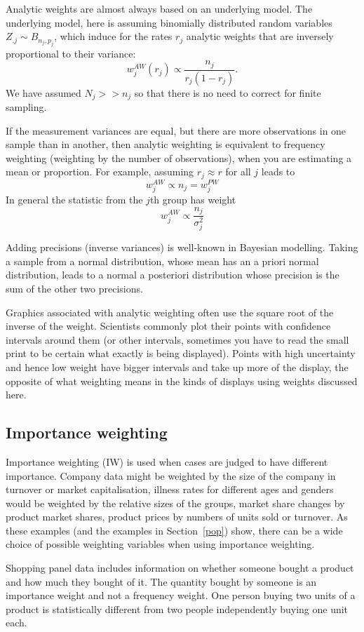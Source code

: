 \documentclass{svmult}
\begin{document}
Analytic weights are almost always based on an underlying model. The underlying model, here is assuming binomially distributed random variables $Z_{.j} \sim B_{n_j, p_j}$, which induce for the rates $r_j$ analytic weights that are inversely proportional to their variance:
\[
w_j^{AW}(r_j) \propto \frac{n_j}{r_j(1-r_j)}.
\]
We have assumed $N_j>>n_j$ so that there is no need to correct for finite sampling.
 
If the measurement variances are equal, but there are more observations in one sample than in another, then analytic weighting is equivalent to frequency weighting (weighting by the number of observations), when you are estimating a mean or proportion.  For example, assuming $r_j\approx r$ for all $j$ leads to
$$w_j^{AW} \propto n_j=w_j^{PW}$$
In general the statistic from the $j$th group has weight
$$w_j^{AW} \propto \frac{n_j}{\sigma^2_j}$$

Adding precisions (inverse variances) is well-known in Bayesian modelling.  Taking a sample from a normal distribution, whose mean has an a priori normal distribution, leads to a normal a posteriori distribution whose precision is the sum of the other two precisions.

Graphics associated with analytic weighting often use the square root of the inverse of the weight.  Scientists commonly plot their points with confidence intervals around them (or other intervals, sometimes you have to read the small print to be certain what exactly is being displayed).  Points with high uncertainty and hence low weight have bigger intervals and take up more of the display, the opposite of what weighting means in the kinds of displays using weights discussed here.

\subsection{Importance weighting}
\label{iw}
Importance weighting (IW) is used when cases are judged to have different importance.  Company data might be weighted by the size of the company in turnover or market capitalisation, illness rates for different ages and genders would be weighted by the relative sizes of the groups, market share changes by product market shares, product prices by numbers of units sold or turnover.  As these examples (and the examples in Section~\ref{pop}) show, there can be a wide choice of possible weighting variables when using importance weighting.

Shopping panel data includes information on whether someone bought a product and how much they bought of it.  The quantity bought by someone is an importance weight and not a frequency weight.  One person buying two units of a product is statistically different from two people independently buying one unit each.
\end{document}
